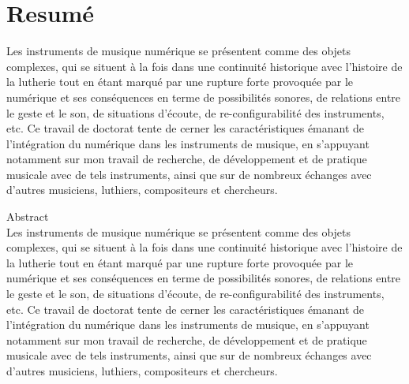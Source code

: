 %
\chapter*{Resumé}
\label{sec:abstract}
\vspace*{-10mm}

Les instruments de musique numérique se présentent comme des objets complexes, qui se situent à la fois dans une continuité historique avec l'histoire de la lutherie tout en étant marqué par une rupture forte provoquée par le numérique et ses conséquences en terme de possibilités sonores, de relations entre le geste et le son, de situations d'écoute, de re-configurabilité des instruments, etc. Ce travail de doctorat tente de cerner les caractéristiques émanant de l'intégration du numérique dans les instruments de musique, en s'appuyant notamment sur mon travail de recherche, de développement et de pratique musicale avec de tels instruments, ainsi que sur de nombreux échanges avec d'autres musiciens, luthiers, compositeurs et chercheurs.

\vspace*{20mm}

{Abstract}\label{sec:abstract-diff} \\

Les instruments de musique numérique se présentent comme des objets complexes, qui se situent à la fois dans une continuité historique avec l'histoire de la lutherie tout en étant marqué par une rupture forte provoquée par le numérique et ses conséquences en terme de possibilités sonores, de relations entre le geste et le son, de situations d'écoute, de re-configurabilité des instruments, etc. Ce travail de doctorat tente de cerner les caractéristiques émanant de l'intégration du numérique dans les instruments de musique, en s'appuyant notamment sur mon travail de recherche, de développement et de pratique musicale avec de tels instruments, ainsi que sur de nombreux échanges avec d'autres musiciens, luthiers, compositeurs et chercheurs.